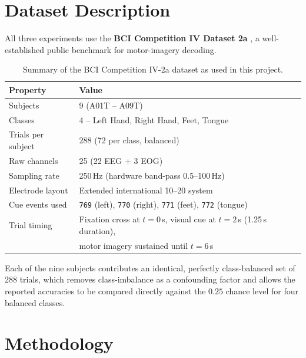 \documentclass[11pt,a4paper]{article}
\begin{document}
\section{Dataset Description}
\label{sec:dataset}

All three experiments use the \textbf{BCI Competition IV Dataset 2a} \cite{brunner2008bci}, a
well-established public benchmark for motor-imagery decoding.

\begin{table}[H]
\centering
\caption{Summary of the BCI Competition IV-2a dataset as used in this project.}
\label{tab:dataset-summary}
\begin{tabular}{ll}
\toprule
\textbf{Property} & \textbf{Value} \\
\midrule
Subjects & 9 (A01T -- A09T) \\
Classes & 4 -- Left Hand, Right Hand, Feet, Tongue \\
Trials per subject & 288 (72 per class, balanced) \\
Raw channels & 25 (22 EEG + 3 EOG) \\
Sampling rate & 250\,Hz (hardware band-pass 0.5--100\,Hz) \\
Electrode layout & Extended international 10--20 system \\
Cue events used & \texttt{769} (left), \texttt{770} (right), \texttt{771} (feet), \texttt{772} (tongue) \\
Trial timing & Fixation cross at $t{=}0$\,s, visual cue at $t{=}2$\,s (1.25\,s duration), \\
             & motor imagery sustained until $t{=}6$\,s \\
\bottomrule
\end{tabular}
\end{table}

Each of the nine subjects contributes an identical, perfectly class-balanced set of 288 trials,
which removes class-imbalance as a confounding factor and allows the reported accuracies to be
compared directly against the $0.25$ chance level for four balanced classes.

\section{Methodology}
\label{sec:methodology}
\end{document}

